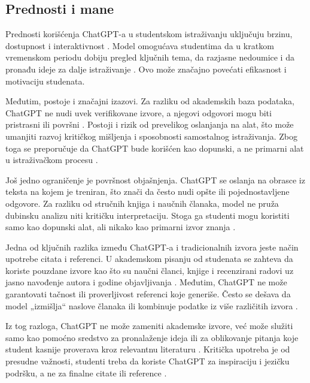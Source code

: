 \documentclass[12pt]{article}
\begin{document}
\subsection{Prednosti i mane}
Prednosti korišćenja ChatGPT-a u studentskom istraživanju uključuju brzinu, dostupnost i interaktivnost \cite{baig2024systematic}. Model omogućava studentima da u kratkom vremenskom periodu dobiju pregled ključnih tema, da razjasne nedoumice i da pronađu ideje za dalje istraživanje \cite{alsaedi2024chatgpt}. Ovo može značajno povećati efikasnost i motivaciju studenata.

Međutim, postoje i značajni izazovi. Za razliku od akademskih baza podataka, 
\\ChatGPT ne nudi uvek verifikovane izvore, a njegovi odgovori mogu biti pristrasni ili površni \cite{edwards2023chatgpt}. Postoji i rizik od prevelikog oslanjanja na alat, što može umanjiti razvoj kritičkog mišljenja i sposobnosti samostalnog istraživanja. Zbog toga se preporučuje da ChatGPT bude korišćen kao dopunski, a ne primarni alat u istraživačkom procesu \cite{montenegro2023impact}.


Još jedno ograničenje je površnost objašnjenja. ChatGPT se oslanja na obrasce iz teksta na kojem je treniran, što znači da često nudi opšte ili pojednostavljene odgovore. Za razliku od stručnih knjiga i naučnih članaka, model ne pruža dubinsku analizu niti kritičku interpretaciju. Stoga ga studenti mogu koristiti samo kao dopunski alat, ali nikako kao primarni izvor znanja \cite{zakova2025exploring}.

Jedna od ključnih razlika između ChatGPT-a i tradicionalnih izvora jeste način upotrebe citata i referenci. U akademskom pisanju od studenata se zahteva da koriste pouzdane izvore kao što su naučni članci, knjige i recenzirani radovi uz jasno navođenje autora i godine objavljivanja \cite{montenegro2023impact}. Međutim, ChatGPT ne može garantovati tačnost ili proverljivost referenci koje generiše. Često se dešava da model „izmišlja“ naslove članaka ili kombinuje podatke iz više različitih izvora \cite{edwards2023chatgpt}.

Iz tog razloga, ChatGPT ne može zameniti akademske izvore, već može služiti samo kao pomoćno sredstvo za pronalaženje ideja ili za oblikovanje pitanja koje student kasnije proverava kroz relevantnu literaturu \cite{zakova2025exploring}. Kritička upotreba je od presudne važnosti, studenti treba da koriste ChatGPT za inspiraciju i jezičku podršku, a ne za finalne citate ili reference \cite{xu2025patterns}.
\end{document}

